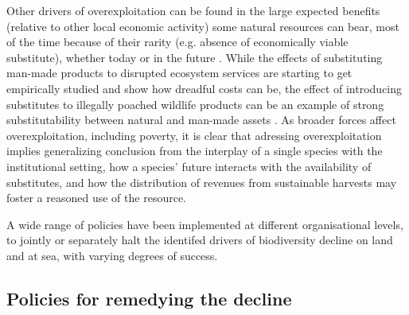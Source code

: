 	Other drivers of overexploitation can be found in the large expected benefits (relative to other local economic activity) some natural resources can bear, most of the time because of their rarity (e.g. absence of economically viable substitute), whether today or in the future \citep{Kremer2000}. While the effects of substituting man-made products to disrupted ecosystem services are starting to get empirically studied \citep{frank_economic_2024} and show how dreadful costs can be, the effect of introducing substitutes to illegally poached wildlife products can be an example of strong substitutability between natural and man-made assets \citep{chen_economics_2017}. As broader forces affect overexploitation, including poverty, it is clear that adressing overexploitation implies generalizing conclusion from the interplay of a single species with the institutional setting, how a  species' future interacts with the availability of substitutes, and how the distribution of revenues from sustainable harvests may foster a reasoned use of the resource. 
	
	A wide range of policies have been implemented at different organisational levels, to jointly or separately halt the identifed drivers of biodiversity decline on land and at sea, with varying degrees of success.


\subsection*{Policies for remedying the decline}

